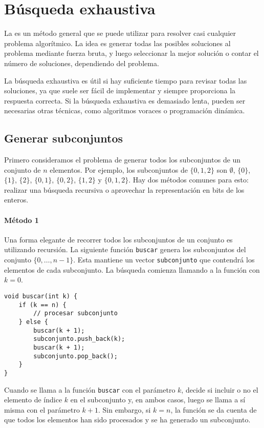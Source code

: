\chapter{Búsqueda exhaustiva}

La 
es un método general que se puede utilizar
para resolver casi cualquier problema algorítmico.
La idea es generar todas las posibles
soluciones al problema mediante fuerza bruta,
y luego seleccionar la mejor solución o contar el
número de soluciones, dependiendo del problema.

La búsqueda exhaustiva es útil
si hay suficiente tiempo para revisar todas las soluciones,
ya que suele ser fácil de implementar
y siempre proporciona la respuesta correcta.
Si la búsqueda exhaustiva es demasiado lenta,
pueden ser necesarias otras técnicas, como algoritmos voraces o
programación dinámica.

\section{Generar subconjuntos}


Primero consideramos el problema de generar
todos los subconjuntos de un conjunto de $n$ elementos.
Por ejemplo, los subconjuntos de $\{0,1,2\}$ son
$\emptyset$, $\{0\}$, $\{1\}$, $\{2\}$, $\{0,1\}$,
$\{0,2\}$, $\{1,2\}$ y $\{0,1,2\}$.
Hay dos métodos comunes para esto:
realizar una búsqueda recursiva
o aprovechar la representación en bits de los enteros.

\subsubsection{Método 1}

Una forma elegante de recorrer todos los subconjuntos
de un conjunto es utilizando recursión.
La siguiente función \texttt{buscar}
genera los subconjuntos del conjunto
$\{0,\ldots,n-1\}$.
Esta mantiene un vector \texttt{subconjunto}
que contendrá los elementos de cada subconjunto.
La búsqueda comienza llamando
a la función con $k = 0$.

\begin{lstlisting}
void buscar(int k) {
    if (k == n) {
        // procesar subconjunto
    } else {
        buscar(k + 1);
        subconjunto.push_back(k);
        buscar(k + 1);
        subconjunto.pop_back();
    }
}
\end{lstlisting}

Cuando se llama a la función \texttt{buscar}
con el parámetro $k$,
decide si incluir o no el
elemento de índice $k$ en el subconjunto
y, en ambos casos,
luego se llama a sí misma con el parámetro $k+1$.
Sin embargo, si $k=n$, la función se da cuenta de que
todos los elementos han sido procesados
y se ha generado un subconjunto.

